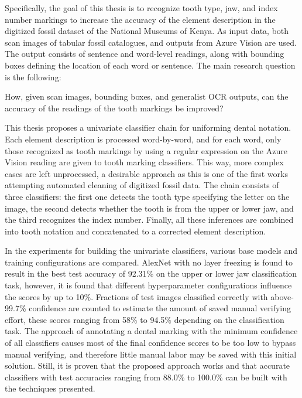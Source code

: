\documentclass[english,twoside,openright]{UH_DS_MSc}
\begin{document}
Specifically, the goal of this thesis is to recognize tooth type,
jaw, and index number markings to increase the accuracy of the element description in
the digitized fossil dataset of the National Museums of Kenya. As input data, both scan images of tabular fossil catalogues,
and outputs from Azure Vision are used.
The output consists of sentence and word-level readings, along with bounding boxes defining 
the location of each word or sentence. The main research question is the following: 

How, given scan images, bounding boxes, and generalist OCR outputs, can the accuracy of the readings of the tooth markings be improved?

This thesis proposes a univariate classifier chain for
uniforming dental notation. Each element description is processed 
word-by-word, and for each word, only those recognized as tooth markings
by using a regular expression on the Azure Vision reading are given to tooth marking
classifiers. This way, more complex cases are left unprocessed, a desirable
approach as this is one of the first works attempting automated cleaning 
of digitized fossil data. The chain consists of three classifiers: the first one detects the tooth type specifying the letter on the image, the second detects whether the tooth is from the upper or lower jaw,
and the third recognizes the index number. Finally, all these inferences are combined into tooth notation and concatenated to a corrected element 
description. 

In the experiments for building the univariate classifiers, various base models and training configurations are compared.
AlexNet with no layer freezing is found to result in the best test accuracy of 92.31\% on the 
upper or lower jaw classification task, however, it is found that different hyperparameter 
configurations influence the scores by up to 10\%. 
Fractions of test images classified correctly with above-99.7\% confidence are 
counted to estimate the amount of saved manual verifying effort, these scores ranging 
from 58\% to 94.5\% depending on the classification task.
The approach of annotating a dental marking with the minimum 
confidence of all classifiers causes most of the final confidence scores 
to be too low to bypass manual verifying, and therefore little manual labor may be 
saved with this initial solution. Still, it is proven that the proposed approach works and that 
accurate classifiers with test accuracies ranging from 88.0\% to 100.0\% can be built 
with the techniques presented.
\end{document}
